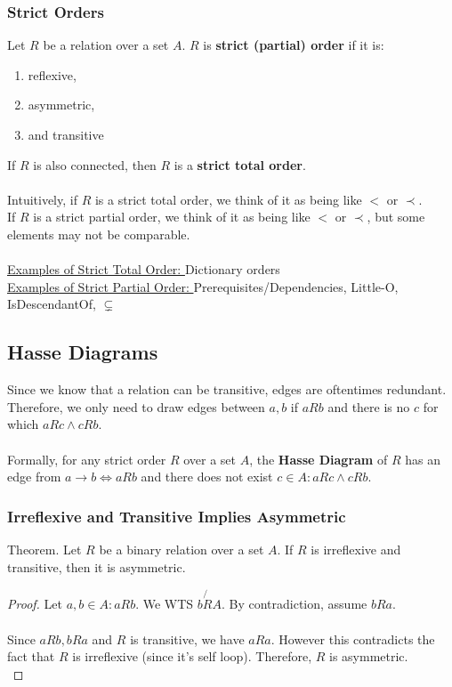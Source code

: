 \documentclass{article}
\begin{document}
\subsubsection{Strict Orders}
Let $R$ be a relation over a set $A$. $R$ is \textbf{strict (partial) order} if it is:
\begin{enumerate}
    \item reflexive,
    \item asymmetric,
    \item and transitive
\end{enumerate}
If $R$ is also connected, then $R$ is a \textbf{strict total order}.\\
\\
Intuitively, if $R$ is a strict total order, we think of it as being like $<$ or $\prec$.\\
If $R$ is a strict partial order, we think of it as being like $<$ or $\prec$, but some elements may not be comparable.\\
\\
\underline{Examples of Strict Total Order: }Dictionary orders\\
\underline{Examples of Strict Partial Order: }Prerequisites/Dependencies, Little-O, IsDescendantOf, $\subsetneq$
\subsection{Hasse Diagrams}
Since we know that a relation can be transitive, edges are oftentimes redundant. Therefore, we only need to draw edges between $a, b$ if $aRb$ and there is no $c$ for which $aRc \land cRb$.\\
\\
Formally, for any strict order $R$ over a set $A$, the \textbf{Hasse Diagram} of $R$ has an edge from $a \to b \iff aRb$ and there does not exist $c \in A : aRc \land cRb$. 
\subsubsection{Irreflexive and Transitive Implies Asymmetric}
Theorem. Let $R$ be a binary relation over a set $A$. If $R$ is irreflexive and transitive, then it is asymmetric.\\
\begin{proof}
    Let $a,b \in A : aRb$. We WTS $b\not{R}A$. By contradiction, assume $bRa$.\\
    \\
    Since $aRb, bRa$ and $R$ is transitive, we have $aRa$. However this contradicts the fact that $R$ is irreflexive (since it's self loop). Therefore, $R$ is asymmetric.\\
\end{proof}
\\
\\
\end{document}
